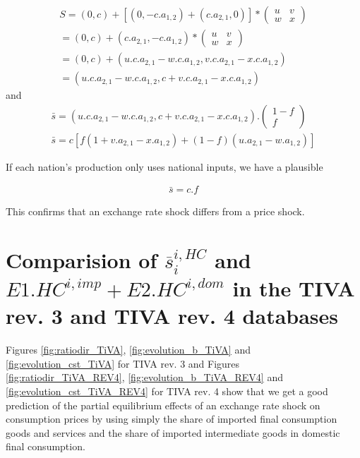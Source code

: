 \documentclass[11pt,a4paper]{article}
\begin{document}
\begin{appendices}
\begin{gather*}
S =\left(0,c\right)+\left[\left(0,-c.a_{1,2}\right)+\left(c.a_{2,1},0\right)\right]*\left(\begin{matrix}u&v\\w&x\end{matrix}\right)
\\
=\left(0,c\right)+\left(c.a_{2,1},-c.a_{1,2}\right)*\left(\begin{matrix}u&v\\w&x\end{matrix}\right)
\\
=\left(0,c\right)+\left(u.c.a_{2,1}-w.c.a_{1,2},v.c.a_{2,1}-x.c.a_{1,2}\right)
\\
=\left(u.c.a_{2,1}-w.c.a_{1,2},c+v.c.a_{2,1}-x.c.a_{1,2}\right)
\end{gather*}
and
\begin{gather*}
\bar{s}=\left(u.c.a_{2,1}-w.c.a_{1,2},c+v.c.a_{2,1}-x.c.a_{1,2}\right).\left(\begin{matrix}1-f\\f\end{matrix}\right)
\\
\bar{s}=c\left[f\left(1+v.a_{2,1}-x.a_{1,2}\right)+\left(1-f\right)\left(u.a_{2,1}-w.a_{1,2}\right)\right]
\end{gather*}


If each nation's production only uses national inputs, we have a plausible

\begin{gather*}
\bar{s}=c.f
\end{gather*}

This confirms that an exchange rate shock differs from a price shock.

\newpage
\section{Comparision of $\overline{s}_{i}^{i,HC}$ and $E1.HC^{i,imp}+E2.HC^{i,dom}$ in the TIVA rev. 3 and TIVA rev. 4 databases} \label{AppendixFonctionLinéaireTIVA}

Figures \ref{fig:ratiodir_TiVA}, \ref{fig:evolution_b_TiVA} and \ref{fig:evolution_cst_TiVA} for TIVA rev. 3 and Figures \ref{fig:ratiodir_TiVA_REV4}, \ref{fig:evolution_b_TiVA_REV4} and \ref{fig:evolution_cst_TiVA_REV4} for TIVA rev. 4 show that we get a good prediction of the partial equilibrium effects of an exchange rate shock on consumption prices by using simply the share of imported final consumption goods and services and the share of imported intermediate goods in domestic final consumption.





\end{appendices}
\end{document}
